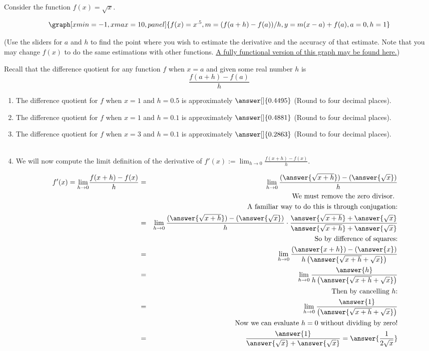 \documentclass{ximera}
\begin{document}
\begin{question}
Consider the function $f(x)=\sqrt{x}$.  

\begin{onlineOnly}
$$\graph[xmin=-1,xmax=10, panel]{f(x)=x^{.5},m=(f(a+h)-f(a))/h,  y=m(x-a)+f(a), a=0, h=1}$$
\end{onlineOnly}
(Use the sliders for $a$ and $h$ to find the point where you wish to estimate the derivative and the accuracy of that estimate.  Note that you may change $f(x)$ to do the same estimations with other functions.  \href{https://www.desmos.com/calculator/1tkd8mob7k}{A fully functional version of this graph may be found here.})


Recall that the difference quotient for any function $f$ when $x=a$ and given some real number $h$ is $$\frac{f(a+h)-f(a)}{h}$$

\begin{enumerate}
\item The difference quotient for $f$ when $x=1$ and $h=0.5$ is approximately $\answer[ ]{0.4495}$ (Round to four decimal places). 
\item The difference quotient for $f$ when $x=1$ and $h=0.1$ is approximately $\answer[ ]{0.4881}$ (Round to four decimal places).  
\item The difference quotient for $f$ when $x=3$ and $h=0.1$ is approximately $\answer[ ]{0.2863}$ (Round to four decimal places).\\ \\
\item We will now compute the limit definition of the derivative of $ f'(x):={\displaystyle \lim_{h\to 0}} \frac{f(x+h)-f(x)}{h}$.

\begin{eqnarray*}
f'(x)={\displaystyle \lim_{h\to 0}} \frac{f(x+h)-f(x)}{h}&=& \displaystyle \lim_{h\to 0}\frac{(\answer{\sqrt{x+h}})-(\answer{\sqrt{x}})}{h}\\
&&\text{We must remove the zero divisor. }\\ && \text{A familiar way to do this is through conjugation:}\\
&=& \displaystyle \lim_{h\to 0}\frac{(\answer{\sqrt{x+h}})-(\answer{\sqrt{x}})}{h}\cdot \frac{\answer{\sqrt{x+h}}+\answer{\sqrt{x}}}{\answer{\sqrt{x+h}}+\answer{\sqrt{x}}}\\
&&\text{So by difference of squares:}\\
&=& \displaystyle \lim_{h\to 0}\frac{(\answer{x+h})-(\answer{x})}{h\left(\answer{\sqrt{x+h}+\sqrt{x}}\right)}\\
&=& \displaystyle \lim_{h\to 0}\frac{\answer{h}}{h\left(\answer{\sqrt{x+h}+\sqrt{x}}\right)}\\
&&\text{Then by cancelling $h$:}\\
&=& \displaystyle \lim_{h\to 0}\frac{\answer{1}}{\left(\answer{\sqrt{x+h}+\sqrt{x}}\right)}\\
&&\text{Now we can evaluate $h=0$ without dividing by zero!}\\
&=&\frac{\answer{1}}{\answer{\sqrt{x}}+\answer{\sqrt{x}}}= \answer{\frac{1}{2\sqrt{x}}}
\end{eqnarray*}



\end{enumerate}
\end{question}
\end{document}
